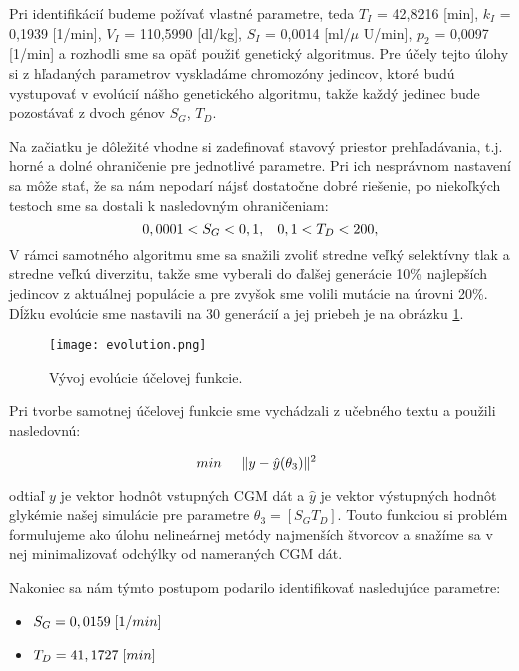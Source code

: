 \documentclass[11pt]{article} %
\begin{document}
Pri identifikácií budeme požívať vlastné parametre, teda $T_I$ = 42,8216 [min], $k_I$ = 0,1939 [1/min], $V_I$ = 110,5990 [dl/kg], $S_I$ = 0,0014 [ml/$\mu$ U/min], $p_2$ = 0,0097 [1/min] a rozhodli sme sa opäť použiť genetický algoritmus. Pre účely tejto úlohy si z hľadaných parametrov vyskladáme chromozóny jedincov, ktoré budú vystupovať v evolúcií nášho genetického algoritmu, takže každý jedinec bude pozostávať z dvoch génov $S_G$, $T_D$.

Na začiatku je dôležité vhodne si zadefinovať stavový priestor prehľadávania, t.j. horné a dolné ohraničenie pre jednotlivé parametre. Pri ich nesprávnom nastavení sa môže stať, že sa nám nepodarí nájsť dostatočne dobré riešenie, po niekoľkých testoch sme sa dostali k nasledovným ohraničeniam: 
\[ 0,0001 < S_G < 0,1, \hspace{3mm} 0,1 < T_D < 200, \] 
V rámci samotného algoritmu sme sa snažili zvoliť stredne veľký selektívny tlak a stredne veľkú diverzitu, takže sme vyberali do ďalšej generácie 10\% najlepších jedincov z aktuálnej populácie a pre zvyšok sme volili mutácie na úrovni 20\%. Dĺžku evolúcie sme nastavili na 30 generácií a jej priebeh je na obrázku \ref{fig:evolution}.

\begin{figure}[!htb]
	\centering
	\texttt{[image: evolution.png]} 
	\caption{Vývoj evolúcie účelovej funkcie.}
	\label{fig:evolution}
\end{figure}

Pri tvorbe samotnej účelovej funkcie sme vychádzali z učebného textu a použili nasledovnú:

\begin{equation}
 min \hspace{5mm} \| y - \hat{y}(\theta_3) \|^2 \hspace{2mm}  
\end{equation}

odtiaľ $y$ je vektor hodnôt vstupných CGM dát a $\hat{y}$  je vektor výstupných hodnôt glykémie našej simulácie pre parametre $\theta_3 = [S_G  T_D]$. Touto funkciou si problém formulujeme ako úlohu nelineárnej metódy najmenších štvorcov a snažíme sa v nej minimalizovať odchýlky od nameraných CGM dát. 

Nakoniec sa nám týmto postupom podarilo identifikovať nasledujúce parametre:
\begin{itemize}
\item $S_G = 0,0159 \hspace{1mm}[1/min]$ 
\item $T_D = 41,1727 \hspace{1mm}[min]$ 
\end{itemize}
\end{document}
